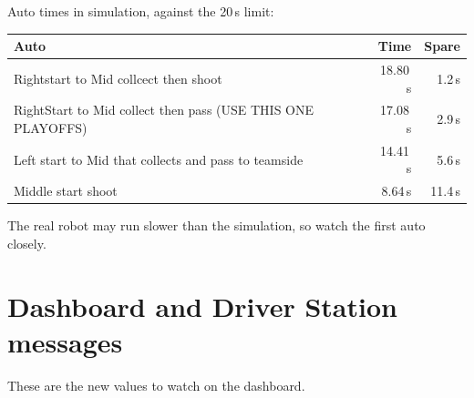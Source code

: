 \documentclass[11pt]{article}
\begin{document}
Auto times in simulation, against the 20\,s limit:

\begin{xltabular}{\linewidth}{L r r}
\toprule
\textbf{Auto} & \textbf{Time} & \textbf{Spare} \\
\midrule
\endhead
Rightstart to Mid collcect then shoot                        & 18.80\,s & 1.2\,s \\
RightStart to Mid collect then pass (USE THIS ONE PLAYOFFS)  & 17.08\,s & 2.9\,s \\
Left start to Mid that collects and pass to teamside         & 14.41\,s & 5.6\,s \\
Middle start shoot                                           &  8.64\,s & 11.4\,s \\
\bottomrule
\end{xltabular}

The real robot may run slower than the simulation, so watch the first auto closely.

\section*{Dashboard and Driver Station messages}

These are the new values to watch on the dashboard.
\end{document}
